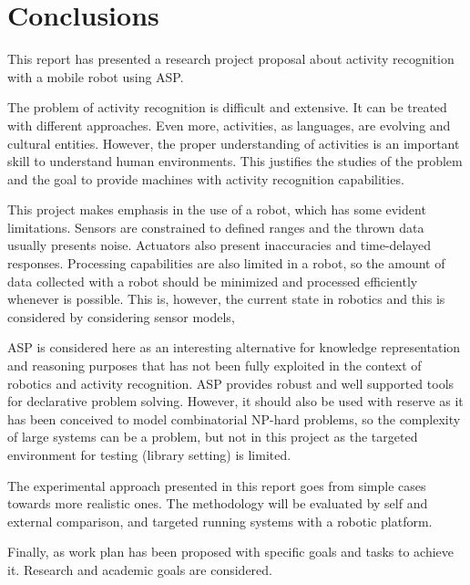 \chapter{Conclusions} \label{ch_conc}

This report has presented a research project proposal about activity recognition with a mobile robot using ASP.

The problem of activity recognition is difficult and extensive. 
It can be treated with different approaches. 
Even more, activities, as languages, are evolving and cultural entities. 
However, the proper understanding of activities is an important skill to understand human environments.
This justifies the studies of the problem and the goal to provide machines with activity recognition capabilities.

This project makes emphasis in the use of a robot, which has some evident limitations.
Sensors are constrained to defined ranges and the thrown data usually presents noise.
Actuators also present inaccuracies and time-delayed responses.
Processing capabilities are also limited in a robot, so the amount of data collected with a robot should be minimized and processed efficiently whenever is possible.
This is, however, the current state in robotics and this is considered by considering sensor models, 

ASP is considered here as an interesting alternative for knowledge representation and reasoning purposes that has not been fully exploited in the context of robotics and activity recognition.
ASP provides robust and well supported tools for declarative problem solving.
However, it should also be used with reserve as it has been conceived to model combinatorial NP-hard problems, so the complexity of large systems can be a problem, but not in this project as the targeted environment for testing (library setting) is limited.

The experimental approach presented in this report goes from simple cases towards more realistic ones. 
The methodology will be evaluated by self and external comparison, and targeted running systems with a robotic platform.

Finally, as work plan has been proposed with specific goals and tasks to achieve it. 
Research and academic goals are considered.
